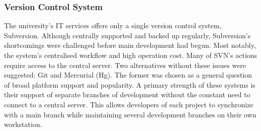 
\subsubsection{Version Control System}
\label{subsub:git}
\label{subsub:vcs}
The university's IT services offers only a single version control system, Subversion. Although centrally supported and backed up regularly, Subversion's shortcomings were challenged before main development had begun. Most notably, the system's centralised workflow and high operation cost. Many of SVN's actions require access to the central server. Two alternatives without these issues were suggested: Git and Mercurial (Hg). The former was chosen as a general question of broad platform support and popularity. A primary strength of these systems is their support of separate branches of development without the constant need to connect to a central server. This allows developers of each project to synchronize with a main branch while maintaining several development branches on their own workstation.

